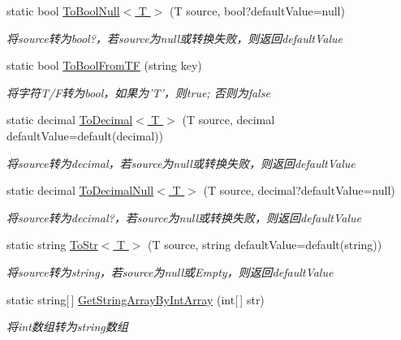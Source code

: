 \begin{DoxyCompactItemize}
static bool \hyperlink{class_x_c_l_net_tools_1_1_common_1_1_data_type_convert_a3d03337886d7f9f8c0904be41d5ff54d}{To\-Bool\-Null$<$ T $>$} (T source, bool?default\-Value=null)
\begin{DoxyCompactList}\small\item\em 将source转为bool?，若source为null或转换失败，则返回default\-Value \end{DoxyCompactList}\item 
static bool \hyperlink{class_x_c_l_net_tools_1_1_common_1_1_data_type_convert_addd3068d336ba1a73e020e456d93e239}{To\-Bool\-From\-T\-F} (string key)
\begin{DoxyCompactList}\small\item\em 将字符\-T/\-F转为bool，如果为'T'，则true; 否则为false \end{DoxyCompactList}\item 
static decimal \hyperlink{class_x_c_l_net_tools_1_1_common_1_1_data_type_convert_aed8222be8178bb287242a97c48c82aa1}{To\-Decimal$<$ T $>$} (T source, decimal default\-Value=default(decimal))
\begin{DoxyCompactList}\small\item\em 将source转为decimal，若source为null或转换失败，则返回default\-Value \end{DoxyCompactList}\item 
static decimal \hyperlink{class_x_c_l_net_tools_1_1_common_1_1_data_type_convert_ad952d29f33cca205d031e02e46332e45}{To\-Decimal\-Null$<$ T $>$} (T source, decimal?default\-Value=null)
\begin{DoxyCompactList}\small\item\em 将source转为decimal?，若source为null或转换失败，则返回default\-Value \end{DoxyCompactList}\item 
static string \hyperlink{class_x_c_l_net_tools_1_1_common_1_1_data_type_convert_a2a23ae0b4ca4ac0329c93697dc0b5fd6}{To\-Str$<$ T $>$} (T source, string default\-Value=default(string))
\begin{DoxyCompactList}\small\item\em 将source转为string，若source为null或\-Empty，则返回default\-Value \end{DoxyCompactList}\item 
static string\mbox{[}$\,$\mbox{]} \hyperlink{class_x_c_l_net_tools_1_1_common_1_1_data_type_convert_a4c641616a2414eeb45ee4e89390faf1b}{Get\-String\-Array\-By\-Int\-Array} (int\mbox{[}$\,$\mbox{]} str)
\begin{DoxyCompactList}\small\item\em 将int数组转为string数组 \end{DoxyCompactList}\item 

\end{DoxyCompactItemize}
